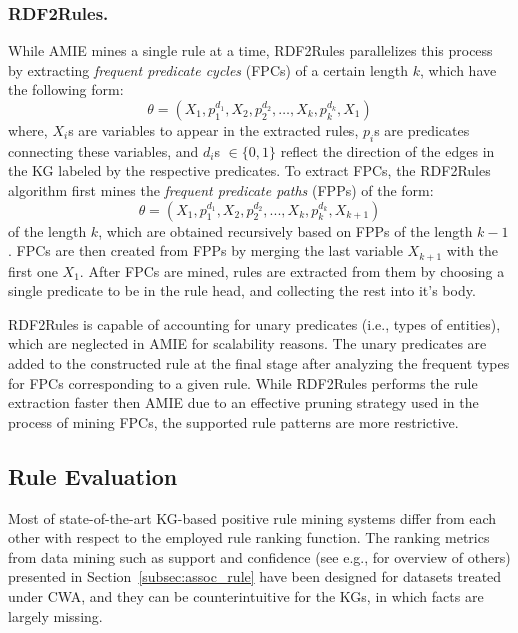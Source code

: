 \subsubsection{RDF2Rules.}
While AMIE mines a single rule at a time, RDF2Rules \cite{rdf2rules} parallelizes this process by extracting \emph{frequent predicate cycles} (FPCs) of %
a certain length $k$, which have the following form:
\[\theta = (X_1, p_1^{d_1}, X_2, p_2^{d_2},\dotsc, X_k, p_k^{d_k}, X_1)\]
where, $X_i$s are variables to appear in the extracted rules, $p_i$s are predicates connecting these variables, and $d_i$s $\in \{0,1\}$ reflect the direction of the edges in the KG labeled by the respective predicates. To extract FPCs, the RDF2Rules algorithm first mines the \emph{frequent predicate paths} (FPPs) of the form:
\[\theta = (X_1, p_1^{d_1}, X_2, p_2^{d_2}, ...,X_k, p_k^{d_k}, X_{k+1})\]
of the length $k$, which are obtained recursively based on FPPs of the length $k-1$. 
FPCs are then created from FPPs by merging the last variable $X_{k+1}$ with the first one $X_1$.
After FPCs are mined, rules are extracted from them by choosing a single %
predicate to be in the rule head, and collecting the rest into it's body. 

RDF2Rules is capable of accounting for unary predicates (i.e., types of entities), which are neglected in AMIE for scalability reasons. %
The unary predicates are added to the constructed rule at the final stage after analyzing the 
frequent types for FPCs corresponding to a given rule.
While RDF2Rules performs the rule extraction faster then AMIE due to an effective pruning strategy
used in the process of mining FPCs, the supported rule patterns are more restrictive. 

\subsection{Rule Evaluation}
Most of state-of-the-art KG-based positive rule mining systems %
differ from each other with respect to the employed %
rule ranking function. %
The ranking metrics from data mining such as support and confidence (see e.g., \cite{metrics-summary} for overview of others) presented in Section~\ref{subsec:assoc_rule} have been designed for datasets treated under CWA, and they can be counterintuitive for the KGs, in which facts are largely missing.

